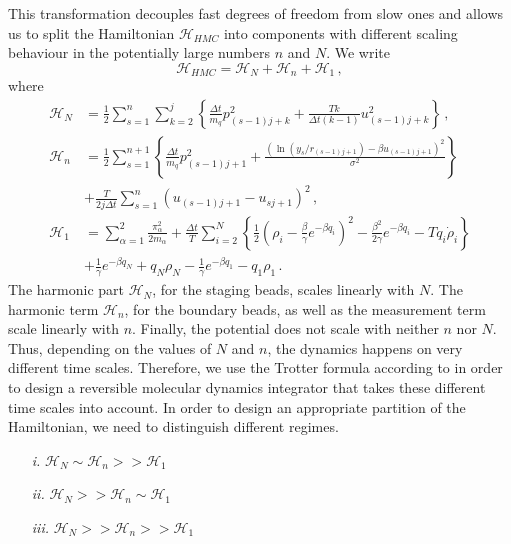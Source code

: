 \documentclass[11pt, a4paper]{article}
\begin{document}
This transformation decouples fast degrees of freedom from slow ones and allows us to split the Hamiltonian $\mathcal H_{HMC}$ into components with different scaling behaviour in the potentially large numbers $n$ and $N$.
We write
\begin{equation}
  \mathcal H_{HMC}= \mathcal H_N+\mathcal H_n+\mathcal H_1\,,
\end{equation}
where
\begin{align}
  \mathcal H_N
  &=
  \frac{1}{2}
  \sum_{s=1}^{n}
  \sum_{k=2}^j
  \left\{
    \frac{\Delta t}{m_q}p_{(s-1)j+k}^2
    +
    \frac{Tk}{\Delta t(k-1)}
    u_{(s-1)j+k}^2
  \right\}\,,\label{H_N}
  \\
  \mathcal H_n
  &=
  \frac{1}{2}
  \sum_{s=1}^{n+1}
  \left\{
   \frac{\Delta t }{m_q}p_{(s-1)j+1}^2
    +
    \frac{(\ln(y_s/r_{(s-1)j+1}) - {\beta u_{(s-1)j+1}})^2}{\sigma^2}
   \right\}
   \\
  \nonumber
  &+
  \frac{T}{2j\Delta t}
  \sum_{s=1}^{n}
    (u_{(s-1)j+1} - u_{sj+1})^2
   \,,\\
  \mathcal H_1
  &=
   \sum_{\alpha=1}^2\frac{\pi_\alpha^2}{2m_\alpha}
   +
  \frac{\Delta t}{T}
   \sum_{i=2}^{N}
   \left\{
    \frac{1}{2}
     \left(
        \rho_i-\frac{\beta}{\gamma}e^{-\beta q_i}
     \right)^2
    -
    \frac{\beta^2}{2\gamma}
    e^{-\beta q_i}
   -
    T q_i\dot\rho_i
   \right\}
  \\
  \nonumber
  &+
  \frac{1}{\gamma}
  e^{-\beta q_N}
  +
  q_N \rho_{N}
  -
  \frac{1}{\gamma}
  e^{-\beta q_1}
  -
  q_1 \rho_{1}
\,.
\end{align}
The harmonic part $\mathcal H_N$, for the staging beads, scales linearly with $N$.
The harmonic term $\mathcal H_n$, for the boundary beads, as well as the measurement term scale linearly with $n$.
Finally, the potential does not scale with neither $n$ nor $N$.
Thus, depending on the values of $N$ and $n$, the dynamics happens on very different time scales.
Therefore, we use the Trotter formula according to \cite{tuckerman1992reversible} in order to design a reversible molecular dynamics integrator that takes these different time scales into account.
In order to design an appropriate partition of the Hamiltonian, we need to distinguish different regimes.
\begin{enumerate}
  \item[\it i.]
  $\mathcal H_N \sim \mathcal H_n >> \mathcal H_1$
  \item[\it ii.]
  $\mathcal H_N >> \mathcal H_n \sim \mathcal H_1$
  \item[\it iii.]
  $\mathcal H_N >> \mathcal H_n >> \mathcal H_1$
\end{enumerate}
\end{document}
